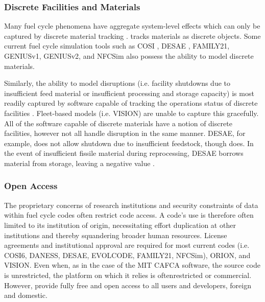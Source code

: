 
\subsubsection{Discrete Facilities and Materials}

Many fuel cycle phenomena have aggregate system-level effects which can only be
captured by discrete material tracking \cite{huff_next_2010}.  \Cyclus
tracks materials as discrete objects. Some current fuel cycle simulation tools
such as \gls{COSI}
\cite{mccarthy_benchmark_2012,grasso_nea-wpfc/fcts_2009,guerin_benchmark_2009},
\gls{DESAE}
\cite{andrianova_desae_2008}, FAMILY21\cite{mccarthy_benchmark_2012},
\gls{GENIUSv1}, \gls{GENIUSv2}, and \gls{NFCSim} also possess the ability to
model discrete materials.

Similarly, the ability to model disruptions (i.e. facility shutdowns due to
insufficient feed material or insufficient processing and storage capacity) is
most readily captured by software capable of tracking the operations status of
discrete facilities \cite{huff_next_2010}.  Fleet-based models (i.e.
\gls{VISION}) are unable to capture this gracefully.  All of the software
capable of discrete materials have a notion of discrete facilities, however not
all handle disruption in the same manner. \gls{DESAE}, for example, does not
allow shutdown due to insufficient feedstock, though \Cyclus does. In the event
of insufficient fissile material during reprocessing, \gls{DESAE} borrows
material from storage, leaving a negative value \cite{mccarthy_benchmark_2012}.

\subsubsection{Open Access}

The proprietary concerns of research institutions and security constraints of
data within fuel cycle codes often restrict code access. A code's use is
therefore often limited to its institution of origin, necessitating effort
duplication at other institutions and thereby squandering broader human
resources. License agreements and institutional approval are required for most
current codes (i.e. \gls{COSI}6, \gls{DANESS}, \gls{DESAE}, EVOLCODE,
FAMILY21, \gls{NFCSim})\cite{juchau_modeling_2010}, ORION, and VISION.  Even when, as in
the case of the MIT \gls{CAFCA} software, the source code is unrestricted, the
platform on which it relies is oftenrestricted or commercial.  However, \Cyclus
provide fully free and open access to all users
and developers, foreign and domestic.

